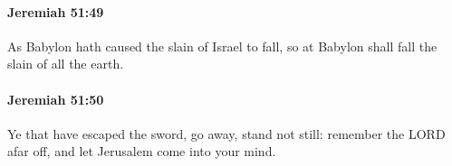 		\paragraph{Jeremiah 51:49} %
			\label{JEREMIAH-51-49}

			As Babylon hath caused the slain of Israel to fall, so at Babylon shall fall the slain of all the earth.


		\paragraph{Jeremiah 51:50} %
			\label{JEREMIAH-51-50}

			Ye that have escaped the sword, go away, stand not still: remember the LORD afar off, and let Jerusalem come into your mind.


